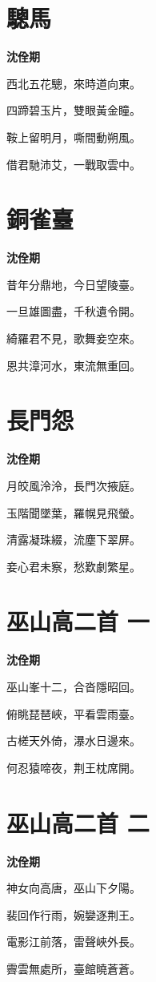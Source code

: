 \documentclass[12pt,a4paper]{ctexbook}
\begin{document}
\section{驄馬}
\textbf{沈佺期}\par\vspace{0.5em}
西北五花驄，來時道向東。\par
四蹄碧玉片，雙眼黃金瞳。\par
鞍上留明月，嘶間動朔風。\par
借君馳沛艾，一戰取雲中。\par

\section{銅雀臺}
\textbf{沈佺期}\par\vspace{0.5em}
昔年分鼎地，今日望陵臺。\par
一旦雄圖盡，千秋遺令開。\par
綺羅君不見，歌舞妾空來。\par
恩共漳河水，東流無重回。\par

\section{長門怨}
\textbf{沈佺期}\par\vspace{0.5em}
月皎風泠泠，長門次掖庭。\par
玉階聞墜葉，羅幌見飛螢。\par
清露凝珠綴，流塵下翠屏。\par
妾心君未察，愁歎劇繁星。\par

\section{巫山高二首 一}
\textbf{沈佺期}\par\vspace{0.5em}
巫山峯十二，合沓隱昭回。\par
俯眺琵琶峽，平看雲雨臺。\par
古槎天外倚，瀑水日邊來。\par
何忍猿啼夜，荆王枕席開。\par

\section{巫山高二首 二}
\textbf{沈佺期}\par\vspace{0.5em}
神女向高唐，巫山下夕陽。\par
裴回作行雨，婉孌逐荆王。\par
電影江前落，雷聲峽外長。\par
霽雲無處所，臺館曉蒼蒼。\par
\end{document}
